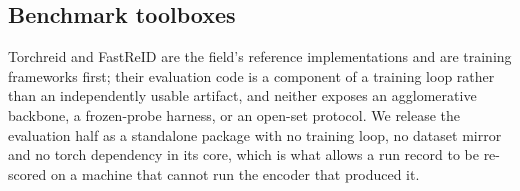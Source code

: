 \subsection{Benchmark toolboxes}
Torchreid \cite{zhou2019torchreid} and FastReID \cite{he2023fastreid} are the field's reference
implementations and are training frameworks first; their evaluation code is a component of a
training loop rather than an independently usable artifact, and neither exposes an
agglomerative backbone, a frozen-probe harness, or an open-set protocol. We release the
evaluation half as a standalone package with no training loop, no dataset mirror and no torch
dependency in its core, which is what allows a run record to be re-scored on a machine that
cannot run the encoder that produced it.
